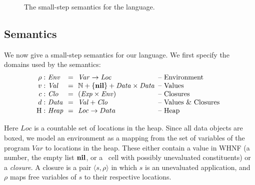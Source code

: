 \documentclass[9pt]{sigplanconf}
\begin{document}
\begin{figure*}[t!]
\begin{center}
\caption{The small-step semantics for the language. \label{fig:lang-semantics}}
\end{center}
\end{figure*}



\subsection{Semantics}
We now give  a small-step semantics for our  language.
We first specify the domains used by the semantics:
\[
\renewcommand{\arraystretch}{1}
\begin{array}{@{}r@{\ }l@{\ \ }c@{\ \ }l@{\hspace{0.5em}}l}
\rho: & \mathit{Env} &=&\mathit{Var} \rightarrow \mathit{Loc} & \mbox{-- Environment} \\
v:   & \mathit{Val} &=& \mathbb{N} + \{\NIL\} + \mathit{Data \times Data}& \mbox{-- Values}\\
c:   & \mathit{Clo} &=& \mathit{(Exp \times Env)}& \mbox{-- Closures}\\
d: & \mathit{Data} &=&\mathit{Val} + \mathit{Clo} & \mbox{-- Values \& Closures} \\
\heap: & \mathit{Heap} & =&\mathit{Loc} \rightarrow Data & \mbox{-- Heap}
\end{array}
\]

Here  $\mathit{Loc}$ is  a countable  set  of locations  in the  heap.
Since all data objects are boxed, we model an environment as a mapping
from the set  of variables of the program  $\mathit{Var}$ to locations
in the  heap.  These  either contain  a value in  WHNF (a  number, the
empty  list  $\mbox{$\mathbf{ nil}$}$,  or  a  \CONS\  cell  with  possibly  unevaluated
constituents) or  a {\em closure}.   A closure  is a pair  $\langle s,
\rho\rangle$ in  which $s$ is  an unevaluated application,  and $\rho$
maps free variables of $s$ to their respective locations.
\end{document}
